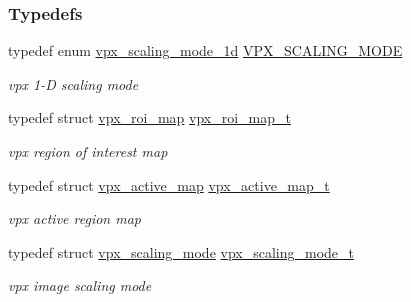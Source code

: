 \subsubsection*{Typedefs}
\begin{DoxyCompactItemize}
\item 
typedef enum \hyperlink{group__vp8__encoder_ga70071b1bb6cac9a1ef0ea3d8362ff94f}{vpx\-\_\-scaling\-\_\-mode\-\_\-1d} \hyperlink{group__vp8__encoder_ga100ca891ad96995e61780ae777bf8663}{V\-P\-X\-\_\-\-S\-C\-A\-L\-I\-N\-G\-\_\-\-M\-O\-D\-E}
\begin{DoxyCompactList}\small\item\em vpx 1-\/\-D scaling mode \end{DoxyCompactList}\item 
typedef struct \hyperlink{structvpx__roi__map}{vpx\-\_\-roi\-\_\-map} \hyperlink{group__vp8__encoder_ga5be1a94d436a5e9296f5be06f57ccbd1}{vpx\-\_\-roi\-\_\-map\-\_\-t}
\begin{DoxyCompactList}\small\item\em vpx region of interest map \end{DoxyCompactList}\item 
typedef struct \hyperlink{structvpx__active__map}{vpx\-\_\-active\-\_\-map} \hyperlink{group__vp8__encoder_ga7b48f7962f5061979f0f8ece6fb1cba8}{vpx\-\_\-active\-\_\-map\-\_\-t}
\begin{DoxyCompactList}\small\item\em vpx active region map \end{DoxyCompactList}\item 
typedef struct \hyperlink{structvpx__scaling__mode}{vpx\-\_\-scaling\-\_\-mode} \hyperlink{group__vp8__encoder_ga9600359ed9096cd96c621d9cf6c8df38}{vpx\-\_\-scaling\-\_\-mode\-\_\-t}
\begin{DoxyCompactList}\small\item\em vpx image scaling mode \end{DoxyCompactList}\end{DoxyCompactItemize}

